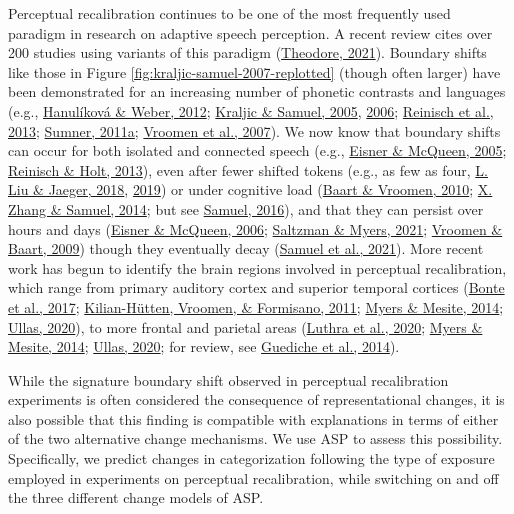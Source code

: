 \documentclass[
  11pt,
  english,
  man,floatsintext]{apa6}
\begin{document}
Perceptual recalibration continues to be one of the most frequently used paradigm in research on adaptive speech perception. A recent review cites over 200 studies using variants of this paradigm (\protect\hyperlink{ref-theodore2021}{Theodore, 2021}). Boundary shifts like those in Figure \ref{fig:kraljic-samuel-2007-replotted} (though often larger) have been demonstrated for an increasing number of phonetic contrasts and languages (e.g., \protect\hyperlink{ref-hanulikova-weber2012}{Hanulíková \& Weber, 2012}; \protect\hyperlink{ref-kraljic-samuel2005}{Kraljic \& Samuel, 2005}, \protect\hyperlink{ref-kraljic-samuel2006}{2006}; \protect\hyperlink{ref-reinisch2013}{Reinisch et al., 2013}; \protect\hyperlink{ref-sumner2011}{Sumner, 2011a}; \protect\hyperlink{ref-vroomen2007}{Vroomen et al., 2007}). We now know that boundary shifts can occur for both isolated and connected speech (e.g., \protect\hyperlink{ref-eisner-mcqueen2005}{Eisner \& McQueen, 2005}; \protect\hyperlink{ref-reinisch-holt2013}{Reinisch \& Holt, 2013}), even after fewer shifted tokens (e.g., as few as four, \protect\hyperlink{ref-liu-jaeger2018}{L. Liu \& Jaeger, 2018}, \protect\hyperlink{ref-liu-jaeger2019}{2019}) or under cognitive load (\protect\hyperlink{ref-baart-vroomen2010}{Baart \& Vroomen, 2010}; \protect\hyperlink{ref-zhang-samuel2014}{X. Zhang \& Samuel, 2014}; but see \protect\hyperlink{ref-samuel2016}{Samuel, 2016}), and that they can persist over hours and days (\protect\hyperlink{ref-eisner-mcqueen2006}{Eisner \& McQueen, 2006}; \protect\hyperlink{ref-saltzman-myers2021}{Saltzman \& Myers, 2021}; \protect\hyperlink{ref-vroomen-baart2009}{Vroomen \& Baart, 2009}) though they eventually decay (\protect\hyperlink{ref-samuel2021}{Samuel et al., 2021}). More recent work has begun to identify the brain regions involved in perceptual recalibration, which range from primary auditory cortex and superior temporal cortices (\protect\hyperlink{ref-bonte2017}{Bonte et al., 2017}; \protect\hyperlink{ref-kilianhutten2011}{Kilian-Hütten, Vroomen, \& Formisano, 2011}; \protect\hyperlink{ref-myers-mesite2014}{Myers \& Mesite, 2014}; \protect\hyperlink{ref-ullas2020}{Ullas, 2020}), to more frontal and parietal areas (\protect\hyperlink{ref-luthra2020a}{Luthra et al., 2020}; \protect\hyperlink{ref-myers-mesite2014}{Myers \& Mesite, 2014}; \protect\hyperlink{ref-ullas2020}{Ullas, 2020}; for review, see \protect\hyperlink{ref-guediche2014}{Guediche et al., 2014}).

While the signature boundary shift observed in perceptual recalibration experiments is often considered the consequence of representational changes, it is also possible that this finding is compatible with explanations in terms of either of the two alternative change mechanisms. We use ASP to assess this possibility. Specifically, we predict changes in categorization following the type of exposure employed in experiments on perceptual recalibration, while switching on and off the three different change models of ASP.
\end{document}
